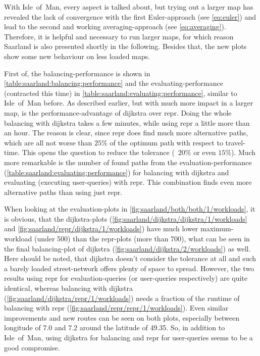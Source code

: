         With Isle~of~Man, every aspect is talked about, but trying out a larger map has revealed the lack of convergence with the first Euler-approach (see \cref{eq:euler}) and lead to the second and working averaging-approach (see \cref{eq:averaging}).
        Therefore, it is helpful and necessary to run larger maps, for which reason Saarland is also presented shortly in the following.
        Besides that, the new plots show some new behaviour on less loaded maps.

        First of, the \gls{balancing}-performance is shown in \vref{table:saarland:balancing:performance} and the evaluating-performance (contracted this time) in \vref{table:saarland:evaluating:performance}, similar to Isle~of~Man before.
        As described earlier, but with much more impact in a larger map, is the performance-advantage of \gls{dijkstra} over \gls{repr}.
        Doing the whole \gls{balancing} with \gls{dijkstra} takes a few minutes, while using \gls{repr} a little more than an hour.
        The reason is clear, since \gls{repr} does find much more alternative paths, which are all not worse than $\si{\num{25} \percent}$ of the optimum path with respect to travel-time.
        This opens the question to reduce the tolerance (\eg\ $\si{\num{20} \percent}$ or even $\si{\num{15} \percent}$).
        Much more remarkable is the number of found paths from the evaluation-performance (\cref{table:saarland:evaluating:performance}) for \gls{balancing} with \gls{dijkstra} and evaluating (executing user-queries) with \gls{repr}.
        This combination finds even more alternative paths than using just \gls{repr}.

        When looking at the evaluation-plots in \vref{fig:saarland/both/both/1/workloads}, it is obvious, that the \gls{dijkstra}-plots (\cref{fig:saarland/dijkstra/dijkstra/1/workloads} and \cref{fig:saarland/repr/dijkstra/1/workloads}) have much lower maximum-workload (under \num{500}) than the \gls{repr}-plots (more than \num{700}), what can be seen in the final \gls{balancing}-plot of \gls{dijkstra} (\cref{fig:saarland/dijkstra/2/workloads}) as well.
        Here should be noted, that \gls{dijkstra} doesn't consider the tolerance at all and such a barely loaded street-network offers plenty of space to spread.
        However, the two results using \gls{repr} for evaluation-queries (or user-queries respectively) are quite identical, whereas \gls{balancing} with \gls{dijkstra} (\cref{fig:saarland/dijkstra/repr/1/workloads}) needs a fraction of the runtime of \gls{balancing} with \gls{repr} (\cref{fig:saarland/repr/repr/1/workloads}).
        Even similar improvements and new routes can be seen on both plots, especially between longitude of \num{7.0} and \num{7.2} around the latitude of \num{49.35}.
        So, in addition to Isle~of~Man, using \gls{dijkstra} for \gls{balancing} and \gls{repr} for user-queries seems to be a good compromise.

